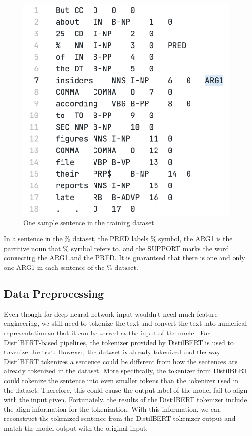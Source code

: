 \documentclass[11pt]{article}
\begin{document}
\begin{figure}[h]
  \centering
  \includegraphics[width=\linewidth]{assets/dataset-one-sample.png}
  \caption{One sample sentence in the training dataset}
  \label{fig:dataset-one-sample}
\end{figure}

In a sentence in the \% dataset, the PRED labels \% symbol, the ARG1 is the partitive noun that \% symbol refers to, and the SUPPORT marks the word connecting the ARG1 and the PRED. It is guaranteed that there is one and only one ARG1 in each sentence of the \% dataset.

\subsection{Data Preprocessing}
\label{section:data-preprocessing}

Even though for deep neural network input wouldn't need much feature engineering, we still need to tokenize the text and convert the text into numerical representation so that it can be served as the input of the model. For DistilBERT-based pipelines, the tokenizer provided by DistilBERT is used to tokenize the text. However, the dataset is already tokenized and the way DistilBERT tokenizes a sentence could be different from how the sentences are already tokenized in the dataset. More specifically, the tokenizer from DistilBERT could tokenize the sentence into even smaller tokens than the tokenizer used in the dataset. Therefore, this could cause the output label of the model fail to align with the input given. Fortunately, the results of the DistilBERT tokenizer include the align information for the tokenization. With this information, we can reconstruct the tokenized sentence from the DistilBERT tokenizer output and match the model output with the original input.
\end{document}
